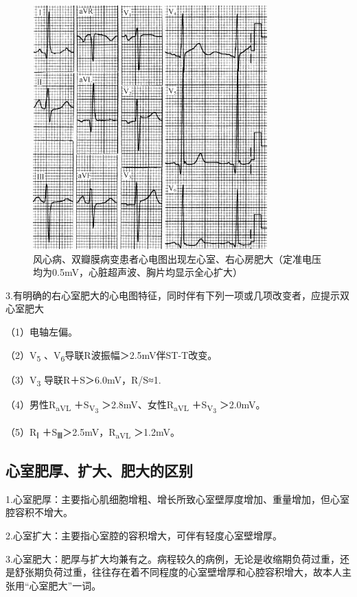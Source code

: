 \begin{figure}[!htbp]
 \centering
 \includegraphics[width=3.55208in,height=3.69792in]{./images/Image00055.jpg}
 \captionsetup{justification=centering}
 \caption{风心病、双瓣膜病变患者心电图出现左心室、右心房肥大（定准电压均为0.5mV，心脏超声波、胸片均显示全心扩大）}
 \label{fig3-6}
  \end{figure} 

3.有明确的右心室肥大的心电图特征，同时伴有下列一项或几项改变者，应提示双心室肥大

（1）电轴左偏。

（2）V\textsubscript{5} 、V\textsubscript{6}导联R波振幅＞2.5mV伴ST-T改变。

（3）V\textsubscript{3} 导联R＋S＞6.0mV，R/S≈1.

（4）男性R\textsubscript{aVL} ＋S\textsubscript{V\textsubscript{3}}
＞2.8mV、女性R\textsubscript{aVL} ＋S\textsubscript{V\textsubscript{3}}
＞2.0mV。

（5）R\textsubscript{Ⅰ} ＋S\textsubscript{Ⅲ}＞2.5mV，R\textsubscript{aVL} ＞1.2mV。

\protect\hypertarget{text00009.htmlux5cux23subid44}{}{}

\subsection{心室肥厚、扩大、肥大的区别}

1.心室肥厚：主要指心肌细胞增粗、增长所致心室壁厚度增加、重量增加，但心室腔容积不增大。

2.心室扩大：主要指心室腔的容积增大，可伴有轻度心室壁增厚。

3.心室肥大：肥厚与扩大均兼有之。病程较久的病例，无论是收缩期负荷过重，还是舒张期负荷过重，往往存在着不同程度的心室壁增厚和心腔容积增大，故本人主张用“心室肥大”一词。

